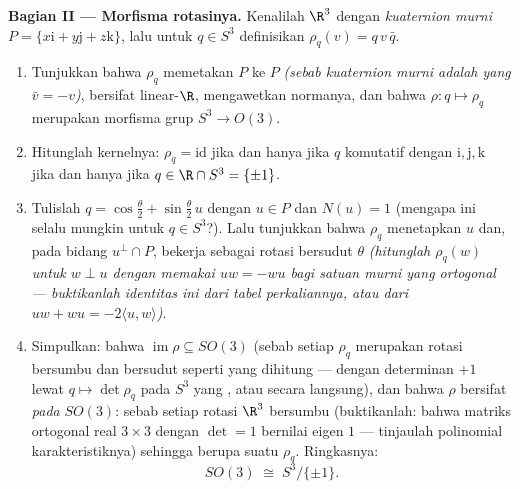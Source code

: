 \begin{problem}
\medskip
\noindent\textbf{Bagian II --- Morfisma rotasinya.} Kenalilah
$\R^3$ dengan \emph{kuaternion murni} $P = \{x\mathrm i +
y\mathrm j + z\mathrm k\}$, lalu untuk $q \in S^3$ definisikan
$\rho_q(v) = q\,v\,\bar q$.
\begin{enumerate}[resume]
  \item Tunjukkan bahwa $\rho_q$ memetakan $P$ ke $P$ \emph{(sebab
        kuaternion murni adalah yang $\bar v = -v$)}, bersifat
        linear-$\R$, mengawetkan normanya, dan bahwa $\rho
        \colon q \mapsto \rho_q$ merupakan morfisma grup $S^3
        \to O(3)$.
  \item Hitunglah kernelnya: $\rho_q = \mathrm{id}$ jika dan hanya jika $q$
        komutatif dengan $\mathrm i, \mathrm j, \mathrm k$ jika dan hanya jika
        $q \in \R\cap S^3 = \{\pm1\}$.
  \item Tulislah $q = \cos\frac\theta2 + \sin\frac\theta2\,u$
        dengan $u \in P$ dan $N(u) = 1$ (mengapa ini selalu
        mungkin untuk $q \in S^3$?). Lalu tunjukkan bahwa $\rho_q$ menetapkan
        $u$ dan, pada bidang $u^\perp\cap P$, bekerja sebagai
        rotasi bersudut $\theta$ \emph{(hitunglah
        $\rho_q(w)$ untuk $w \perp u$ dengan memakai $uw = -wu$ bagi
        satuan murni yang ortogonal --- buktikanlah identitas ini dari
        tabel perkaliannya, atau dari $uw + wu =
        -2\langle u, w\rangle$)}.
  \item Simpulkan: bahwa $\operatorname{im}\rho \subseteq SO(3)$
        (sebab setiap $\rho_q$ merupakan rotasi bersumbu dan bersudut seperti
        yang dihitung --- dengan determinan $+1$ lewat  $q
        \mapsto \det\rho_q$ pada $S^3$ yang , atau
        secara langsung), dan bahwa $\rho$ bersifat \emph{pada} $SO(3)$: sebab setiap
        rotasi $\R^3$ bersumbu (buktikanlah: bahwa matriks ortogonal real
        $3\times3$ dengan $\det = 1$ bernilai eigen $1$ ---
        tinjaulah polinomial karakteristiknya) sehingga berupa suatu $\rho_q$. Ringkasnya:
        \[
        SO(3) \;\cong\; S^3/\{\pm 1\} .
        \]
\end{enumerate}


\end{problem}
